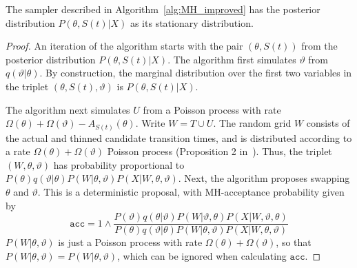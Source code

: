 \begin{proposition}
  The sampler described in Algorithm~\ref{alg:MH_improved} has the posterior distribution $P(\theta,S(t)|X)$ as its stationary distribution.
\end{proposition}
\begin{proof}
  An iteration of the algorithm starts with the pair $(\theta,S(t))$ from the posterior distribution $P(\theta,S(t)|X)$. The algorithm first simulates $\vartheta$ from $q(\vartheta|\theta)$. By construction, the marginal distribution over the first two variables in the triplet $(\theta, S(t), \vartheta)$ is $P(\theta,S(t)|X)$.

  The algorithm next simulates $U$ from a Poisson process with rate $\Omega(\theta) + \Omega(\vartheta) - A_{S(t)}(\theta)$. Write $W = T \cup U$.
  The random grid $W$ consists of the actual and thinned candidate transition times, and is distributed according to a rate $\Omega(\theta) + \Omega(\vartheta)$ Poisson process (Proposition 2 in~\cite{RaoTeh13}). 
  Thus, the triplet $(W,\theta,\vartheta)$ has probability proportional to $P(\theta)q(\vartheta|\theta)P(W|\theta,\vartheta) P(X|W,\theta,\vartheta)$.
  Next, the algorithm proposes swapping $\theta$ and $\vartheta$. 
  This is a deterministic proposal, with MH-acceptance probability given by
  $$\texttt{acc} = 1 \wedge \frac{P(\vartheta)q(\theta|\vartheta)P(W|\vartheta,\theta)
P(X|W,\vartheta,\theta)}{P(\theta)q(\vartheta|\theta)P(W|\theta,\vartheta)
P(X|W,\theta,\vartheta)}$$
$P(W|\theta,\vartheta)$ is just a Poisson process with rate $\Omega(\theta)+ \Omega(\vartheta)$, so that $P(W|\theta,\vartheta) = P(W|\theta,\vartheta)$, which can be ignored when calculating $\texttt{acc}$. 


\end{proof}
